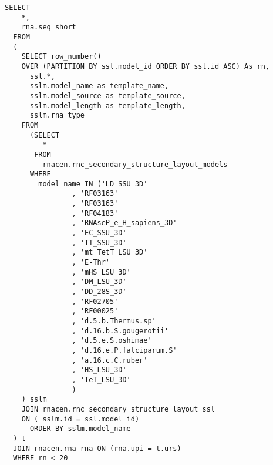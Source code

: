 \begin{lstlisting}[caption={SQL dotaz pro získání struktur vygenerovaných ze zvolených vzorových struktur},label=structsql]
  SELECT 
    *,
    rna.seq_short
  FROM 
  (
    SELECT row_number() 
    OVER (PARTITION BY ssl.model_id ORDER BY ssl.id ASC) As rn,
      ssl.*,
      sslm.model_name as template_name, 
      sslm.model_source as template_source, 
      sslm.model_length as template_length, 
      sslm.rna_type
    FROM
      (SELECT 
         * 
       FROM 
         rnacen.rnc_secondary_structure_layout_models
      WHERE
        model_name IN ('LD_SSU_3D'
                , 'RF03163'
                , 'RF03163'
                , 'RF04183'
                , 'RNAseP_e_H_sapiens_3D'
                , 'EC_SSU_3D'
                , 'TT_SSU_3D'
                , 'mt_TetT_LSU_3D'
                , 'E-Thr'
                , 'mHS_LSU_3D'
                , 'DM_LSU_3D'
                , 'DD_28S_3D'
                , 'RF02705'
                , 'RF00025'
                , 'd.5.b.Thermus.sp'
                , 'd.16.b.S.gougerotii'
                , 'd.5.e.S.oshimae'
                , 'd.16.e.P.falciparum.S'
                , 'a.16.c.C.ruber'
                , 'HS_LSU_3D'
                , 'TeT_LSU_3D'
                )
    ) sslm
    JOIN rnacen.rnc_secondary_structure_layout ssl 
    ON ( sslm.id = ssl.model_id)        
      ORDER BY sslm.model_name    
  ) t
  JOIN rnacen.rna rna ON (rna.upi = t.urs)
  WHERE rn < 20
\end{lstlisting}

